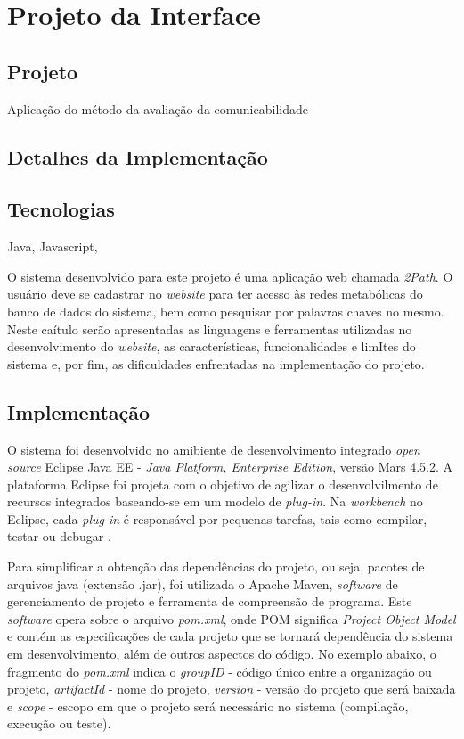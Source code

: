 \chapter{Projeto da Interface}

\section{Projeto}

Aplicação do método da avaliação da comunicabilidade

\section{Detalhes da Implementação}

\section{Tecnologias}
Java, Javascript,






\indent O sistema desenvolvido para este projeto é uma aplicação web chamada \textit{2Path}. O usuário deve se cadastrar no \textit{website} para ter acesso às redes metabólicas do banco de dados do sistema, bem como pesquisar por palavras chaves no mesmo. Neste caítulo serão apresentadas as linguagens e ferramentas utilizadas no desenvolvimento do \textit{website}, as características, funcionalidades e limItes do sistema e, por fim, as dificuldades enfrentadas na implementação do projeto.

\section{Implementação}

\indent O sistema foi desenvolvido no amibiente de desenvolvimento integrado \textit{open source} Eclipse Java EE - \textit{Java Platform, Enterprise Edition}, versão Mars 4.5.2. A plataforma Eclipse foi projeta com o objetivo de agilizar o desenvolvilmento de recursos integrados baseando-se em um modelo de \textit{plug-in}. Na \textit{workbench} no Eclipse, cada \textit{plug-in} é responsável por pequenas tarefas, tais como compilar, testar ou debugar \cite{eclipseDoc}.

\indent Para simplificar a obtenção das dependências do projeto, ou seja, pacotes de arquivos java (extensão .jar), foi utilizada o Apache Maven, \textit{software} de gerenciamento de projeto e ferramenta de compreensão de programa. Este \textit{software} opera sobre o arquivo \textit{pom.xml}, onde POM significa \textit{Project Object Model} e contém as especificações de cada projeto que se tornará dependência do sistema em desenvolvimento, além de outros aspectos do código. No exemplo abaixo, o fragmento do \textit{pom.xml} indica o \textit{groupID} - código único entre a organização ou projeto, \textit{artifactId} - nome do projeto, \textit{version} - versão do projeto que será baixada e \textit{scope} - escopo em que o projeto será necessário no sistema (compilação, execução ou teste).

